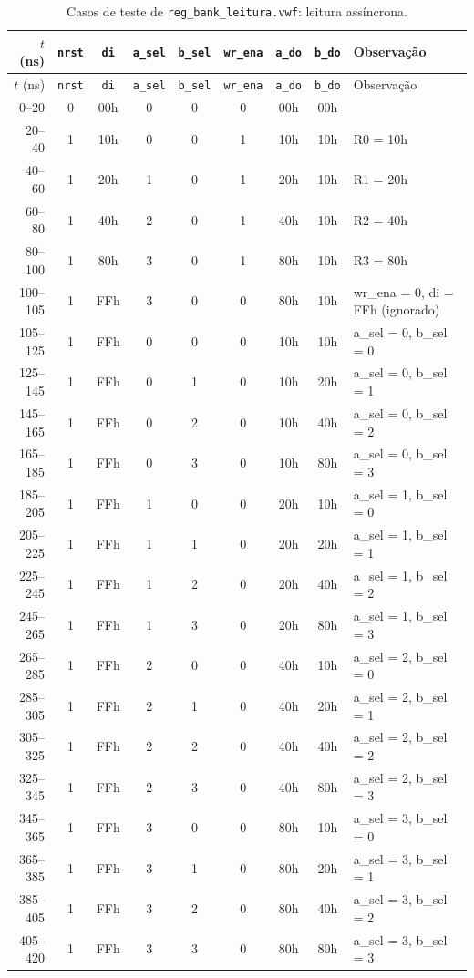 {\scriptsize\setlength{\tabcolsep}{3pt}
\begin{longtable}{rcccccccp{5.3cm}}
\caption{Casos de teste de \texttt{reg\_bank\_leitura.vwf}: leitura assíncrona.}
\label{tab:caso-reg-bank-leitura}\\
\hline $t$ (ns) & \texttt{nrst} & \texttt{di} & \texttt{a\_sel} & \texttt{b\_sel} & \texttt{wr\_ena} & \texttt{a\_do} & \texttt{b\_do} & Observação \\ \hline \endfirsthead
\hline $t$ (ns) & \texttt{nrst} & \texttt{di} & \texttt{a\_sel} & \texttt{b\_sel} & \texttt{wr\_ena} & \texttt{a\_do} & \texttt{b\_do} & Observação \\ \hline \endhead
0--20 & 0 & 00h & 0 & 0 & 0 & 00h & 00h &  \\
20--40 & 1 & 10h & 0 & 0 & 1 & 10h & 10h & R0 = 10h \\
40--60 & 1 & 20h & 1 & 0 & 1 & 20h & 10h & R1 = 20h \\
60--80 & 1 & 40h & 2 & 0 & 1 & 40h & 10h & R2 = 40h \\
80--100 & 1 & 80h & 3 & 0 & 1 & 80h & 10h & R3 = 80h \\
100--105 & 1 & FFh & 3 & 0 & 0 & 80h & 10h & wr\_ena = 0, di = FFh (ignorado) \\
105--125 & 1 & FFh & 0 & 0 & 0 & 10h & 10h & a\_sel = 0, b\_sel = 0 \\
125--145 & 1 & FFh & 0 & 1 & 0 & 10h & 20h & a\_sel = 0, b\_sel = 1 \\
145--165 & 1 & FFh & 0 & 2 & 0 & 10h & 40h & a\_sel = 0, b\_sel = 2 \\
165--185 & 1 & FFh & 0 & 3 & 0 & 10h & 80h & a\_sel = 0, b\_sel = 3 \\
185--205 & 1 & FFh & 1 & 0 & 0 & 20h & 10h & a\_sel = 1, b\_sel = 0 \\
205--225 & 1 & FFh & 1 & 1 & 0 & 20h & 20h & a\_sel = 1, b\_sel = 1 \\
225--245 & 1 & FFh & 1 & 2 & 0 & 20h & 40h & a\_sel = 1, b\_sel = 2 \\
245--265 & 1 & FFh & 1 & 3 & 0 & 20h & 80h & a\_sel = 1, b\_sel = 3 \\
265--285 & 1 & FFh & 2 & 0 & 0 & 40h & 10h & a\_sel = 2, b\_sel = 0 \\
285--305 & 1 & FFh & 2 & 1 & 0 & 40h & 20h & a\_sel = 2, b\_sel = 1 \\
305--325 & 1 & FFh & 2 & 2 & 0 & 40h & 40h & a\_sel = 2, b\_sel = 2 \\
325--345 & 1 & FFh & 2 & 3 & 0 & 40h & 80h & a\_sel = 2, b\_sel = 3 \\
345--365 & 1 & FFh & 3 & 0 & 0 & 80h & 10h & a\_sel = 3, b\_sel = 0 \\
365--385 & 1 & FFh & 3 & 1 & 0 & 80h & 20h & a\_sel = 3, b\_sel = 1 \\
385--405 & 1 & FFh & 3 & 2 & 0 & 80h & 40h & a\_sel = 3, b\_sel = 2 \\
405--420 & 1 & FFh & 3 & 3 & 0 & 80h & 80h & a\_sel = 3, b\_sel = 3 \\
\hline
\end{longtable}}
\vspace{-0.9cm}
